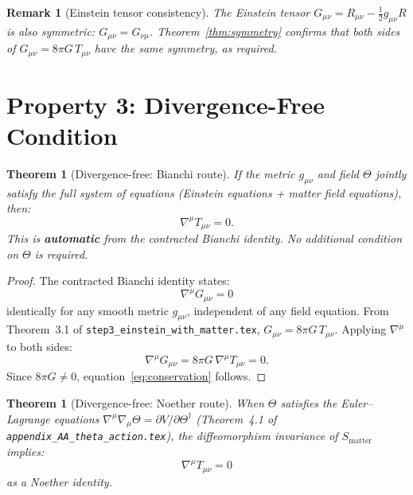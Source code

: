 \documentclass[12pt]{article}
\newtheorem{theorem}[definition]{Theorem}
\newtheorem{remark}[definition]{Remark}
\begin{document}
\begin{remark}[Einstein tensor consistency]
  The Einstein tensor $G_{\mu\nu} = R_{\mu\nu} - \tfrac{1}{2}g_{\mu\nu}R$
  is also symmetric: $G_{\mu\nu} = G_{\nu\mu}$.  Theorem~\ref{thm:symmetry}
  confirms that both sides of $G_{\mu\nu} = 8\pi G\,T_{\mu\nu}$ have the
  same symmetry, as required.
\end{remark}

\section{Property 3: Divergence-Free Condition}

\begin{theorem}[Divergence-free: Bianchi route]
\label{thm:divergence_bianchi}
If the metric $g_{\mu\nu}$ and field $\Theta$ jointly satisfy the full
system of equations (Einstein equations + matter field equations), then:
\begin{equation}
  \label{eq:conservation}
  \nabla^\mu T_{\mu\nu} = 0.
\end{equation}
This is \textbf{automatic} from the contracted Bianchi identity.
No additional condition on $\Theta$ is required.
\end{theorem}

\begin{proof}
  The contracted Bianchi identity states:
  \begin{equation}
    \nabla^\mu G_{\mu\nu} = 0
  \end{equation}
  identically for any smooth metric $g_{\mu\nu}$, independent of any
  field equation.  From Theorem~3.1 of
  \texttt{step3\_einstein\_with\_matter.tex},
  $G_{\mu\nu} = 8\pi G\,T_{\mu\nu}$.
  Applying $\nabla^\mu$ to both sides:
  \begin{equation}
    \nabla^\mu G_{\mu\nu} = 8\pi G\,\nabla^\mu T_{\mu\nu} = 0.
  \end{equation}
  Since $8\pi G \neq 0$, equation~\eqref{eq:conservation} follows.
\end{proof}

\begin{theorem}[Divergence-free: Noether route]
\label{thm:divergence_noether}
When $\Theta$ satisfies the Euler--Lagrange equations
$\nabla^\mu\nabla_\mu\Theta = \partial V/\partial\Theta^\dagger$
(Theorem~4.1 of \texttt{appendix\_AA\_theta\_action.tex}), the
diffeomorphism invariance of $S_{\mathrm{matter}}$ implies:
\begin{equation}
  \nabla^\mu T_{\mu\nu} = 0
\end{equation}
as a Noether identity.
\end{theorem}
\end{document}

